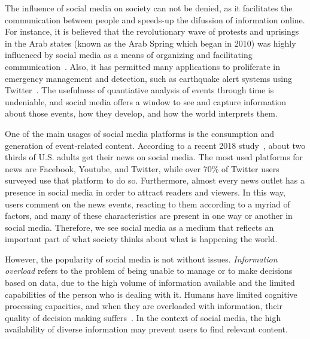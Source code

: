 The influence of social media on society can not be denied, as it facilitates
the communication between people and speeds-up the difussion of information
online. 
%
For instance, it is believed that the revolutionary wave of protests and
uprisings in the Arab states (known as the Arab Spring which began in 2010) was
highly influenced by social media as a means of organizing and facilitating
communication~\cite{howard2011opening}. 
%
Also, it has permitted many applications to proliferate in emergency management
and detection, such as earthquake alert systems using
Twitter~\cite{Sakaki2010,Sakaki:Tweet:2013,Sarmiento:2018:DDE:3201064.3201077,Mendoza2019}.
%
The usefulness of quantiative analysis of events through time is undeniable, and
social media offers a window to see and capture information about those events,
how they develop, and how the world interprets them.





One of the main usages of social media platforms is the consumption and
generation of event-related content. 
%
According to a recent 2018 study~\cite{pewresearch}, about two thirds of U.S.
adults get their news on social media.
%
The most used platforms for news are Facebook, Youtube, and Twitter,
while over 70\% of Twitter users surveyed use that platform to do so.
%
Furthermore, almost every news outlet has a presence in social media
in order to attract readers and viewers.
%
In this way, users comment on the news events, reacting to them according to a
myriad of factors, and many of these characteristics are present in one way or
another in social media.
%
Therefore, we see social media as a medium that reflects an important 
part of what society thinks about what is happening the world.





However, the popularity of social media is not without issues. 
%
{\em Information overload} refers to the problem of being unable to manage or to
make decisions based on data, due to the high volume of information available
and the limited capabilities of the person who is dealing with it. 
%
Humans have limited cognitive processing capacities, and when they are
overloaded with information, their quality of decision making
suffers~\cite{gross1964managing}. 
%
In the context of social media, the high availability of diverse information may
prevent users to find relevant content.


